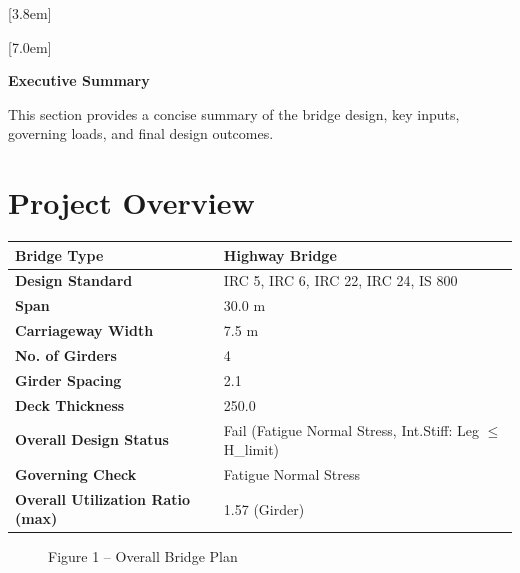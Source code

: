 \documentclass[12pt,a4paper]{report}
\numberwithin{table}{chapter}
\numberwithin{figure}{chapter}
\begin{document}
[3.8em]
  {\normalfont}
  {\contentslabel{2.3em}}
  {\hspace*{-2.3em}}
  {\hfill\contentspage}

[7.0em]
  {\normalfont}
  {\contentslabel{3.2em}}
  {\hspace*{-3.2em}}
  {\hfill\contentspage}

\newpage
\renewcommand{\contentsname}{\centering\Large\bfseries Table of Contents}
\tableofcontents


\newpage
{\centering\Large\bfseries Executive Summary\par}
\vspace{0.8em}

This section provides a concise summary of the bridge design, key inputs, governing loads, and final design outcomes.

\section*{Project Overview}
\label{sec:project-overview}


\begin{tabular}{|L{5.5cm}|L{8.5cm}|}
\hline
\textbf{Bridge Type} & Highway Bridge \\
\hline
\textbf{Design Standard} & IRC 5, IRC 6, IRC 22, IRC 24, IS 800 \\
\hline
\textbf{Span} & 30.0 m \\
\hline
\textbf{Carriageway Width} & 7.5 m \\
\hline
\textbf{No. of Girders} & 4 \\
\hline
\textbf{Girder Spacing} & 2.1 \\
\hline
\textbf{Deck Thickness} & 250.0 \\
\hline
\textbf{Overall Design Status} & Fail (Fatigue Normal Stress, Int.Stiff:\allowbreak{} Leg $\leq$ H\_\allowbreak{}limit) \\
\hline
\textbf{Governing Check} & Fatigue Normal Stress \\
\hline
\textbf{Overall Utilization Ratio (max)} & 1.57 (Girder) \\
\hline
\end{tabular}


\begin{figure}[H]
\centering
{}
\caption*{Figure 1 -- Overall Bridge Plan}
\end{figure}
\end{document}
